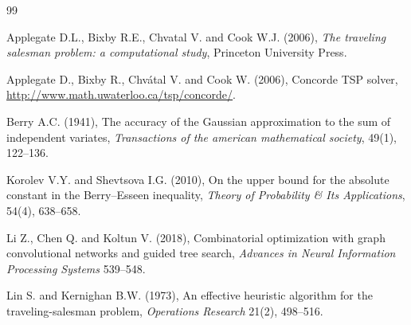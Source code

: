 \documentclass[10pt,twoside]{article}
\numberwithin{equation}{section}
\begin{document}
	


	\begin{thebibliography}{99}


		




		Applegate D.L., Bixby R.E., Chvatal V. and Cook W.J. (2006), {\it The traveling salesman problem: a computational study}, Princeton University Press.


		




		Applegate D., Bixby R., Chv\'atal V. and Cook W. (2006), Concorde {TSP} solver, \url{http://www.math.uwaterloo.ca/tsp/concorde/}.


		




		Berry A.C. (1941), The accuracy of the Gaussian approximation to the sum of independent variates, {\it Transactions of the american mathematical society}, 49(1), 122--136.


		




		Korolev V.Y. and Shevtsova I.G. (2010), On the upper bound for the absolute constant in the Berry–Esseen inequality, {\it Theory of Probability \& Its Applications}, 54(4), 638--658.


								




		Li Z., Chen Q. and Koltun V. (2018), Combinatorial optimization with graph convolutional networks and guided tree search, {\it Advances in Neural Information Processing Systems} 539--548.


		




		Lin S. and Kernighan B.W. (1973), An effective heuristic algorithm for the traveling-salesman problem, {\it Operations Research} 21(2), 498--516.


		





\end{thebibliography}
\end{document}
